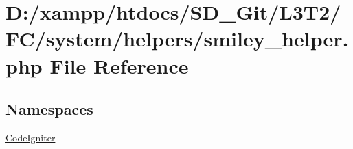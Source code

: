 \hypertarget{system_2helpers_2smiley__helper_8php}{}\section{D\+:/xampp/htdocs/\+S\+D\+\_\+\+Git/\+L3\+T2/\+F\+C/system/helpers/smiley\+\_\+helper.php File Reference}
\label{system_2helpers_2smiley__helper_8php}
\subsection*{Namespaces}
\begin{DoxyCompactItemize}
\item 
 \hyperlink{namespace_code_igniter}{Code\+Igniter}
\end{DoxyCompactItemize}
